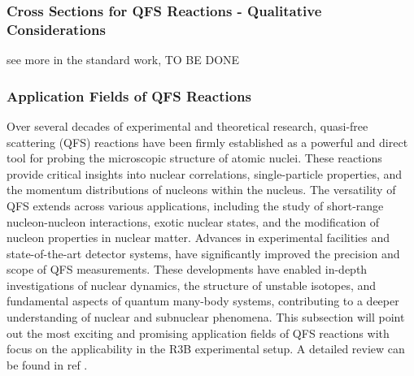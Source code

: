 \subsubsection{Cross Sections for QFS Reactions - Qualitative Considerations}
see more in the standard work, TO BE DONE
\subsubsection{Application Fields of QFS Reactions}
Over several decades of experimental and theoretical research, quasi-free scattering (QFS) reactions have been firmly established as a powerful and direct tool for probing the microscopic structure of atomic nuclei. These reactions provide critical insights into nuclear correlations, single-particle properties, and the momentum distributions of nucleons within the nucleus.\newline
The versatility of QFS extends across various applications, including the study of short-range nucleon-nucleon interactions, exotic nuclear states, and the modification of nucleon properties in nuclear matter. Advances in experimental facilities and state-of-the-art detector systems, have significantly improved the precision and scope of QFS measurements. These developments have enabled in-depth investigations of nuclear dynamics, the structure of unstable isotopes, and fundamental aspects of quantum many-body systems, contributing to a deeper understanding of nuclear and subnuclear phenomena.\newline
This subsection will point out the most exciting and promising application fields of QFS reactions with focus on the applicability in the R3B experimental setup. A detailed review can be found in ref \cite{panin2021quasi}.
